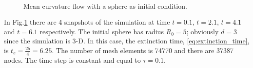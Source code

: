 \documentclass[a4paper,11pt, onecolumn]{article}
\begin{document}
\begin{figure}[htbp]
 \centering
 \quad
 \\
 \quad
 \caption{Mean curvature flow with a sphere as initial condition.}
 \label{fig:mcf_sphere}
\end{figure}

In Fig.\ref{fig:mcf_sphere} there are 4 snapshots of the simulation at time
$t=0.1$, $t=2.1$, $t=4.1$ and $t=6.1$ respectively. The initial sphere has
radius $R_0=5$; obviously $d=3$ since the simulation is 3-D. In this case, the
extinction time, \eqref{eq:extinction_time}, is $t_e=\frac{25}{4}=6.25$. The
number of mesh elements is 74770 and there are 37387 nodes. The time step is
constant and equal to $\tau=0.1$.
\newline
\end{document}
